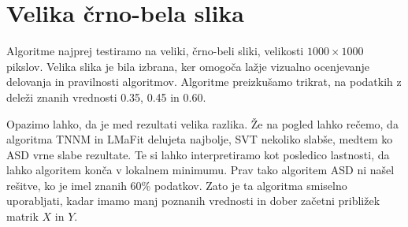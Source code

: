 \section{Velika črno-bela slika} \label{1307-2250}
Algoritme najprej testiramo na veliki, črno-beli sliki, velikosti $1000\times1000$ pikslov. Velika slika je bila izbrana, ker omogoča lažje vizualno ocenjevanje delovanja in pravilnosti algoritmov.
 Algoritme preizkušamo trikrat, na podatkih z deleži znanih vrednosti 0.35, 0.45  in 0.60.

\FloatBarrier


Opazimo lahko, da je med rezultati velika razlika. Že na pogled lahko rečemo, da algoritma TNNM in LMaFit delujeta najbolje, SVT nekoliko slabše, medtem ko
ASD vrne slabe rezultate. Te si lahko interpretiramo kot posledico lastnosti, da lahko algoritem konča v lokalnem minimumu. Prav tako algoritem ASD ni našel rešitve, ko je imel znanih 60\% podatkov. Zato je ta algoritma smiselno uporabljati, kadar imamo manj poznanih vrednosti in dober začetni približek matrik $X$ in $Y$.

